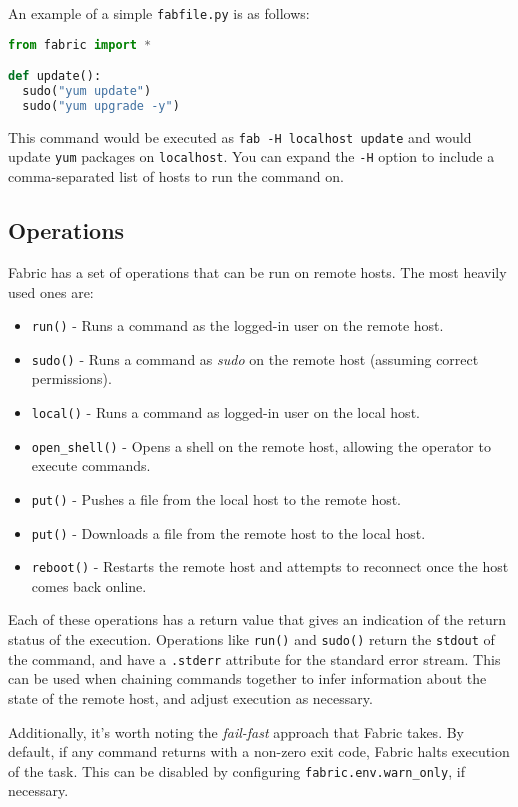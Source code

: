 \documentclass[9pt,twocolumn,twoside]{idsi}
\begin{document}
An example of a simple \texttt{fabfile.py} is as follows:

\begin{lstlisting}[language=Python, showstringspaces=false]
from fabric import *

def update():
  sudo("yum update")
  sudo("yum upgrade -y")
\end{lstlisting}

This command would be executed as \texttt{fab -H localhost update} and would update \texttt{yum} packages on \texttt{localhost}. You can expand the \texttt{-H} option to include a comma-separated list of hosts to run the command on.

\subsection{Operations}

Fabric has a set of operations that can be run on remote hosts. The most heavily used ones are:
\begin{itemize}
  \item \texttt{run()} - Runs a command as the logged-in user on the remote host.
  \item \texttt{sudo()} - Runs a command as \emph{sudo} on the remote host (assuming correct permissions).
  \item \texttt{local()} - Runs a command as logged-in user on the local host.
  \item \texttt{open\_shell()} - Opens a shell on the remote host, allowing the operator to execute commands.
  \item \texttt{put()} - Pushes a file from the local host to the remote host.
  \item \texttt{put()} - Downloads a file from the remote host to the local host.
  \item \texttt{reboot()} - Restarts the remote host and attempts to reconnect once the host comes back online.
\end{itemize}

Each of these operations has a return value that gives an indication of the return status of the execution. Operations like \texttt{run()} and \texttt{sudo()} return the \texttt{stdout} of the command, and have a \texttt{.stderr} attribute for the standard error stream. This can be used when chaining commands together to infer information about the state of the remote host, and adjust execution as necessary.

Additionally, it's worth noting the \emph{fail-fast} approach that Fabric takes. By default, if any command returns with a non-zero exit code, Fabric halts execution of the task. This can be disabled by configuring \texttt{fabric.env.warn\_only}, if necessary.
\end{document}
